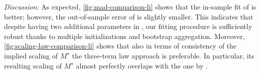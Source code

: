 \documentclass[12pt,a4paper,twoside]{article}
\begin{document}
\textit{Discussion:} As expected, \cref{fig:mad-comparison-li} shows that the in-sample fit of \ttl{} is better; however, the out-of-sample error of \tttl{} is slightly smaller. This indicates that despite having two additional parameters in \tttl{}, our fitting procedure is sufficiently robust thanks to multiple initializations and bootstrap aggregation. Moreover, \cref{fig:scaling-law-comparison-li} shows that also in terms of consistency of the implied scaling of $M^\star$ the three-term law approach is preferable. In particular, its resulting scaling of $M^\star$ almost perfectly overlaps with the one by  \citet{Li2025}. 

\end{document}
